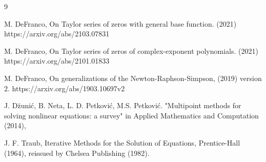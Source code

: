 \documentclass[11pt, oneside]{article}   	%
\begin{document}
\begin{thebibliography}{9}

 M. DeFranco, On Taylor series of zeros with general base function. (2021) https://arxiv.org/abs/2103.07831

 M. DeFranco, On Taylor series of zeros of complex-exponent polynomials. (2021) https://arxiv.org/abs/2101.01833

 M. DeFranco, On generalizations of the Newton-Raphson-Simpson, (2019) version 2. https://arxiv.org/abs/1903.10697v2

 J. D\u{z}uni\'{c}, B. Neta, L. D. Petkovi\'{c}, M.S. Petkovi\'{c}. "Multipoint methods for solving nonlinear equations: a survey" in Applied Mathematics and Computation (2014),

 J. F. Traub, Iterative Methods for the Solution of Equations, Prentice-Hall (1964), reissued by Chelsea Publishing (1982).

\end{thebibliography}
\end{document}
